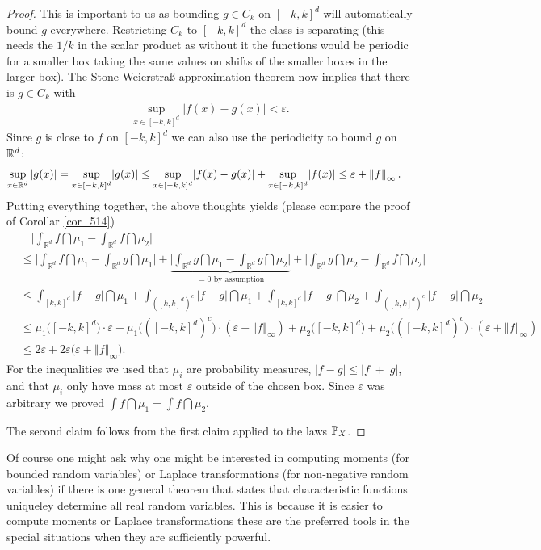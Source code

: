 \begin{proof}[Proof]
			This is important to us as bounding $g\in C_k$ on $[-k,k]^d$ will automatically bound $g$ everywhere. Restricting $C_k$ to $[-k,k]^d$ the class is separating (this needs the $1 /k$ in the scalar product as without it the functions would be periodic for a smaller box taking the same values on shifts of the smaller boxes in the larger box). The Stone-Weierstra\ss{} approximation theorem now implies that there is $g \in C_k$ with 
			\begin{align*}
				\sup_{x\in [-k,k]^d}\lvert f(x) - g(x) \rvert < \varepsilon.
			\end{align*}
			Since $g$ is close to $f$ on $[-k,k]^d$ we can also use the periodicity to bound $g$ on $\R^d$:
			\begin{align*}
				\sup_{x\in\R^d}|g(x)|=\sup_{x\in [-k,k]^d} \lvert g(x) \rvert &\leq \sup_{x\in [-k,k]^d}\lvert f(x) - g(x) \rvert + \sup_{x\in [-k,k]^d} \lvert f(x) \rvert 
					\leq \varepsilon + \left\Vert f \right\Vert_{\infty}.
			\end{align*}
			Putting everything together, the above thoughts yields (please compare the proof of Corollar \ref{cor_514})
			\begin{align*}
				&\quad\Big\lvert \int_{\mathbb{R}^d} f \dint \mu_1 - \int_{\mathbb{R}^d} f \dint \mu_2 \Big\rvert \\
				&\leq \Big\lvert \int_{\mathbb{R}^d} f \dint \mu_1 - \int_{\mathbb{R}^d} g \dint \mu_1 \Big\rvert + \underbrace{ \Big\lvert \int_{\mathbb{R}^d} g \dint \mu_1 - \int_{\mathbb{R}^d} g \dint \mu_2 \Big\rvert }_{= 0 \text{ by assumption}} + \Big\lvert \int_{\mathbb{R}^d} g \dint \mu_2 - \int_{\mathbb{R}^d} f \dint \mu_2 \Big\rvert  \\
&\leq \int_{[k,k]^d}|f-g|\dint \mu_1+ \int_{([k,k]^d)^c}|f-g|\dint \mu_1+ \int_{[k,k]^d}|f-g|\dint \mu_2+ \int_{([k,k]^d)^c}|f-g|\dint \mu_2\\
				& \leq \mu_1 \big( [-k,k]^d \big) \cdot \varepsilon + \mu_1 \big( ([-k,k]^d)^c \big) \cdot ( \varepsilon + \left\Vert f \right\Vert_{\infty}) 
				 +   \mu_2 \big( [-k,k]^d \big)
				+ \mu_2 \big( ([-k,k]^d)^c \big) \cdot ( \varepsilon + \left\Vert f \right\Vert_{\infty}) \\
				&\leq 2 \varepsilon + 2 \varepsilon \big( \varepsilon + \left\Vert f \right\Vert_{\infty} \big).
			\end{align*}
			For the inequalities we used that $\mu_i$ are probability measures, $|f-g|\leq |f|+|g|$, and that $\mu_i$ only have mass at most $\varepsilon$ outside of the chosen box. Since $\varepsilon$ was arbitrary we proved $\int f \dint \mu_1 = \int f \dint \mu_2$.\smallskip

			The second claim follows from the first claim applied to the laws $\P_X$.
\end{proof}
Of course one might ask why one might be interested in computing moments (for bounded random variables) or Laplace transformations (for non-negative random variables) if there is one general theorem that states that characteristic functions uniqueley determine all real random variables. This is because it is easier to compute moments or Laplace transformations these are the preferred tools in the special situations when they are sufficiently powerful.\smallskip

